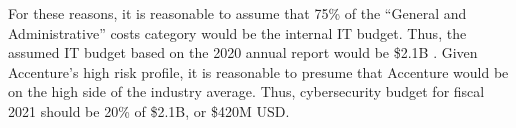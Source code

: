 For these reasons, it is reasonable to assume that 75\% of the ``General and Administrative'' costs category would be the internal IT budget. Thus, the assumed IT budget based on the 2020 annual report would be \$2.1B \parencite{accentureplcAccenture2020Annual2020}. Given Accenture's high risk profile, it is reasonable to presume that Accenture would be on the high side of the industry average. Thus, cybersecurity budget for fiscal 2021 should be 20\% of \$2.1B, or \$420M USD.


